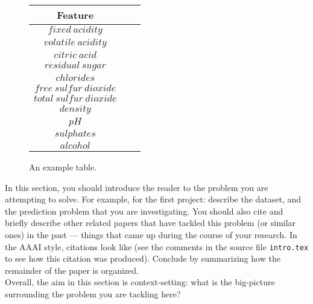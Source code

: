 \begin{figure}[htb]
  \centering %

  \begin{tabular}{|c|c|c|} 
    \hline \hline %
    Feature \\ %
    \hline %
    $fixed~acidity$\\
    $volatile~acidity$\\
    $citric~acid$\\
    $residual~sugar$\\
    $chlorides$\\
    $free~sulfur~dioxide$\\
    $total~sulfur~dioxide$\\
    $density$\\
    $pH$\\
    $sulphates$\\
    $alcohol$\\
    \hline \hline
  \end{tabular}

  \caption{An example table.}
  \label{tab:attributes}
\end{figure}

In this section, you should introduce the reader to the problem you
are attempting to solve. For example, for the first project: describe
the dataset, and the prediction problem that you are
investigating. You should also cite and briefly describe other related
papers that have tackled this problem (or similar ones) in the past
--- things that came up during the course of your research. In the
AAAI style, citations look like \cite{aima} (see the comments in the
source file \texttt{intro.tex} to see how this citation was
produced). Conclude by summarizing how the
remainder of the paper is organized. \\


Overall, the aim in this section is context-setting: what is the
big-picture surrounding the problem you are tackling here?

